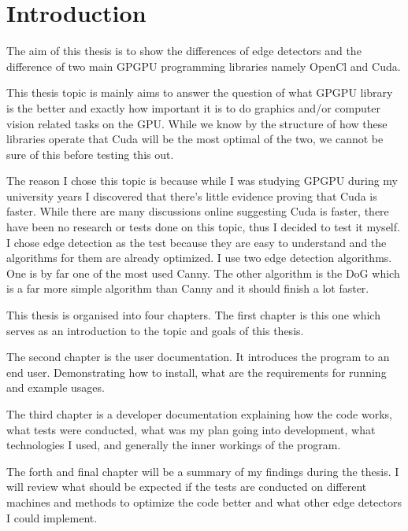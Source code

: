 \chapter{Introduction}
\label{chap:intro}

The aim of this thesis is to show the differences of edge detectors and the difference of two main \ac{GPGPU} programming libraries namely OpenCl and Cuda.

This thesis topic is mainly aims to answer the question of what \ac{GPGPU} library is the better and exactly how important it is to do graphics and/or computer vision related tasks on the \ac{GPU}. While we know by the structure of how these libraries operate that Cuda will be the most optimal of the two, we cannot be sure of this before testing this out.

The reason I chose this topic is because while I was studying \ac{GPGPU} during my university years I discovered that there's little evidence proving that Cuda is faster. While there are many discussions online suggesting Cuda is faster, there have been no research or tests done on this topic, thus I decided to test it myself. I chose edge detection as the test because they are easy to understand and the algorithms for them are already optimized. I use two edge detection algorithms. One is by far one of the most used \ac{Canny}. The other algorithm is the \ac{DoG} which is a far more simple algorithm than \ac{Canny} and it should finish a lot faster.

This thesis is organised into four chapters. The first chapter is this one which serves as an introduction to the topic and goals of this thesis.

The second chapter is the user documentation. It introduces the program to an end user. Demonstrating how to install, what are the requirements for running and example usages.

The third chapter is a developer documentation explaining how the code works, what tests were conducted, what was my plan going into development, what technologies I used, and generally the inner workings of the program.

The forth and final chapter will be a summary of my findings during the thesis. I will review what should be expected if the tests are conducted on different machines and methods to optimize the code better and what other edge detectors I could implement.